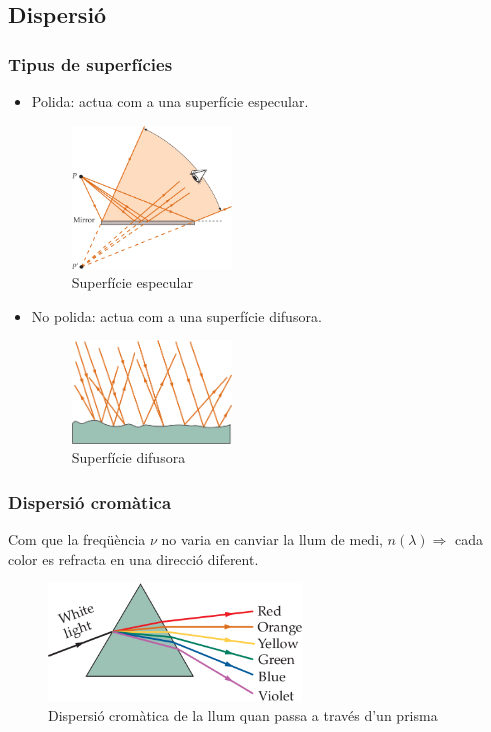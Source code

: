\subsection{Dispersió}
\subsubsection*{Tipus de superfícies}
\begin{itemize}
    \item Polida: actua com a una superfície especular.
        \begin{figure}[H]
        \centering
            \includegraphics[width=0.4\textwidth]{images/3/34-especular.png}
        \caption{Superfície especular}
        \end{figure}
    \item No polida: actua com a una superfície difusora.
        \begin{figure}[H]
        \centering
            \includegraphics[width=0.4\textwidth]{images/3/34-difusor.png}
        \caption{Superfície difusora}
        \end{figure}
\end{itemize}

\subsubsection*{Dispersió cromàtica}
Com que la freqüència $\nu$ no varia en canviar la llum de medi, $n (\lambda) \Rightarrow$ cada color es refracta en una direcció diferent.
\begin{figure}[H]
\centering
    \includegraphics[width=0.6\textwidth]{images/3/34-disp-cromatica.png}
\caption{Dispersió cromàtica de la llum quan passa a través d'un prisma}
\end{figure}

